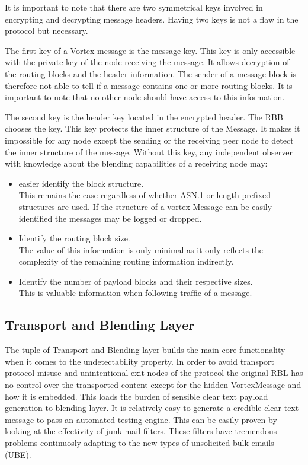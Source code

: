\documentclass[10pt,journal,compsoc]{IEEEtran}
\begin{document}
It is important to note that there are two symmetrical keys involved in encrypting and decrypting message headers. Having two keys is not a flaw in the protocol but necessary. 

The first key of a Vortex message is the message key. This key is only accessible with the private key of the node receiving the message. It allows decryption of the routing blocks and the header information. The sender of a message block is therefore not able to tell if a message contains one or more routing blocks. It is important to note that no other node should have access to this information. 

The second key is the header key located in the encrypted header. The RBB chooses the key. This key protects the inner structure of the Message. It makes it impossible for any node except the sending or the receiving peer node to detect the inner structure of the message. Without this key, any independent observer with knowledge about the blending capabilities of a receiving node may:
\begin{itemize}
	\item easier identify the block structure.\\ 
	This remains the case regardless of whether ASN.1 or length prefixed structures are used. If the structure of a vortex Message can be easily identified the messages may be logged or dropped.
	\item Identify the routing block size.\\
	The value of this information is only minimal as it only reflects the complexity of the remaining routing information indirectly.
	\item Identify the number of payload blocks and their respective sizes. \\
	This is valuable information when following traffic of a message.
\end{itemize}

\subsection{Transport and Blending Layer\label{sec:transportAndBlending}}
The tuple of Transport and Blending layer builds the main core functionality when it comes to the undetectability property. In order to avoid transport protocol misuse and unintentional exit nodes of the protocol the original RBL has no control over the transported content except for the hidden VortexMessage and how it is embedded. This loads the burden of sensible clear text payload generation to blending layer. It is relatively easy to generate a credible clear text message to pass an automated testing engine. This can be easily proven by looking at the effectivity of junk mail filters. These filters have tremendous problems continuosly adapting to the new types of unsolicited bulk emails (UBE).
\end{document}
